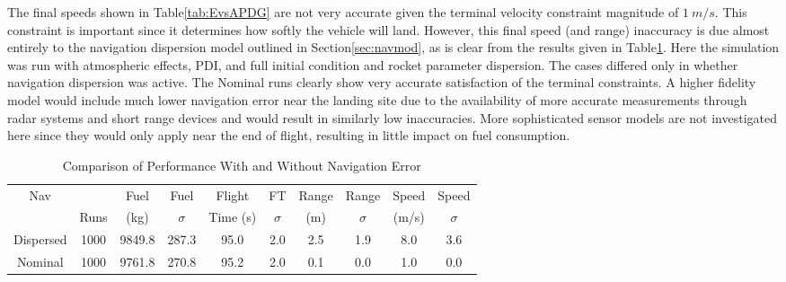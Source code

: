 The final speeds shown in Table\:\ref{tab:EvsAPDG} are not very accurate given the terminal velocity constraint magnitude of $1\:m/s$. This constraint is important since it determines how softly the vehicle will land. However, this final speed (and range) inaccuracy is due almost entirely to the navigation dispersion model outlined in Section\:\ref{sec:navmod}, as is clear from the results given in Table\:\ref{tab:navvsnonav}. Here the simulation was run with atmospheric effects, PDI, and full initial condition and rocket parameter dispersion. The cases differed only in whether navigation dispersion was active. The Nominal runs clearly show very accurate satisfaction of the terminal constraints. A higher fidelity model would include much lower navigation error near the landing site due to the availability of more accurate measurements through radar systems and short range devices and would result in similarly low inaccuracies. More sophisticated sensor models are not investigated here since they would only apply near the end of flight, resulting in little impact on fuel consumption. 

\begin{table}[ht]                                                                                              
	\centering                             
	\caption{Comparison of Performance With and Without Navigation Error}                                          
	\label{tab:navvsnonav}                                                                          
	\begin{tabular}{|c|c|c|c|c|c|c|c|c|c|}                                                                         
		\hline                                                                                                        Nav &      &   Fuel    &    Fuel   & Flight    &   FT     &  Range    &  Range   & Speed   &   Speed  \\ 
		& Runs & (kg)      & $\sigma$  &  Time (s) & $\sigma$ &  (m) &    $  \sigma$ & (m/s)   & $\sigma$ \\
		
		\hline                                                                                                         
		Dispersed & 1000 & 9849.8 & 287.3 & 95.0 & 2.0 & 2.5 & 1.9 & 8.0 & 3.6 \\                                      
		\hline                                                                                                         
		Nominal & 1000 & 9761.8 & 270.8 & 95.2 & 2.0 & 0.1 & 0.0 & 1.0 & 0.0 \\                                   
		\hline                                                                                                         
	\end{tabular}                                                                                                  
	
\end{table}   

